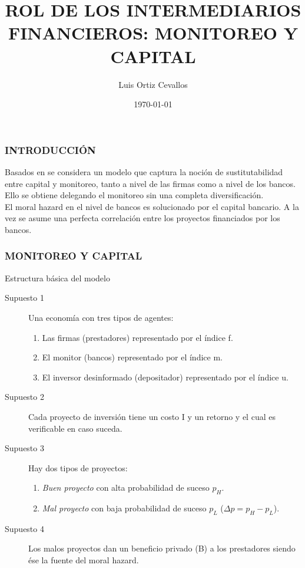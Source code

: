 \documentclass[10pt, xcolor=table, x11names]{beamer}
\title[]{ROL DE LOS INTERMEDIARIOS FINANCIEROS: MONITOREO Y CAPITAL}
\author[Luis Ortiz]{Luis Ortiz Cevallos}
\institute[SECMCA]{\bf SECMCA}
\date[\today]{\footnotesize \today}
\begin{document}
\begin{frame}
\titlepage
\end{frame}




\begin{frame}
	\frametitle{{\normalsize INTRODUCCIÓN} {}}
Basados en  \cite{Tirole1997} se considera un modelo que captura la noción de sustitutabilidad entre capital y monitoreo, tanto a nivel de las firmas como a nivel de los bancos. Ello se obtiene delegando el monitoreo sin una completa diversificación. \\
El moral hazard en el nivel de bancos es solucionado por el capital bancario. A la vez se asume una perfecta correlación entre los proyectos financiados por los bancos.\\



 

\end{frame}

\begin{frame}
    \frametitle{{\normalsize MONITOREO Y CAPITAL} {}}
    
    \begin{block} {Estructura básica del modelo}
        \begin{description}
            \item[Supuesto 1]  Una economía con tres tipos de agentes:
            \begin{enumerate}
                \item Las firmas (prestadores) representado por el índice f.
                \item El monitor (bancos) representado por el índice m.
                \item El inversor desinformado (depositador) representado por el índice u.
            \end{enumerate}  
            \item[Supuesto 2] Cada proyecto de inversión tiene un costo I y un retorno y el cual es verificable en caso suceda. 
            \item[Supuesto 3] Hay dos tipos de proyectos:
            \begin{enumerate}
               \item \textit{Buen proyecto} con alta probabilidad de suceso $p_{H}$.
               \item \textit{Mal proyecto} con baja probabilidad de suceso $p_{L}$ ($\Delta p= p_{H}-p_{L}$). 
            \end{enumerate}
            \item[Supuesto 4] Los malos proyectos dan un beneficio privado (B) a los prestadores siendo ése la fuente del moral hazard.
            
           
             
            \end{description}
        
    \end{block}	
    
\end{frame}
\end{document}
